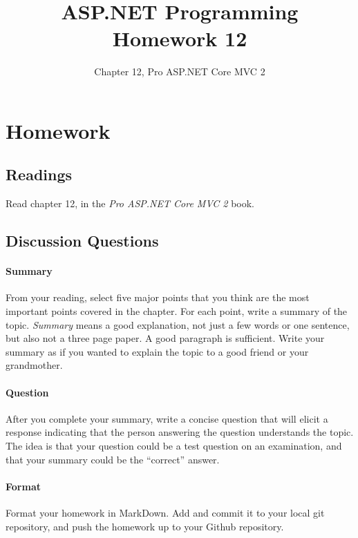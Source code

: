 \documentclass{article}
\title{ASP.NET Programming Homework 12}
\author{Chapter 12, Pro ASP.NET Core MVC 2}
\date{}
\begin{document}
    

    \maketitle{}
    \thispagestyle{fancy}

    \section*{Homework}

        \subsection*{Readings}

        Read chapter 12, in the \textit{Pro ASP.NET Core MVC 2} book.
        
        \subsection*{Discussion Questions}

        \paragraph{Summary} From your reading, select five major points that you think are the most important points covered in the chapter. For each point, write a summary of the topic. \textit{Summary} means a good explanation, not just a few words or one sentence, but also not a three page paper. A good paragraph is sufficient. Write your summary as if you wanted to explain the topic to a good friend or your grandmother. 

        \paragraph{Question} After you complete your summary, write a concise question that will elicit a response indicating that the person answering the question understands the topic. The idea is that your question could be a test question on an examination, and that your summary could be the ``correct'' answer.

        \paragraph{Format} Format your homework in MarkDown. Add and commit it to your local git repository, and push the homework up to your Github repository.
\end{document}
